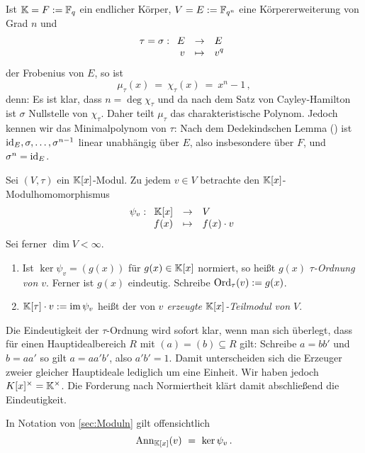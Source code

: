\begin{bemerkung}
  \label{bem:mipo_frob}
  Ist $\mathbb{K}  = F :=\mathbb{F}_q$ ein endlicher Körper, 
  $V = E := \mathbb{F}_{q^n}$ eine Körpererweiterung
  von Grad $n$ und 
  \[\tau = \sigma: \funcdef{E & \to & E\\
    v &\mapsto & v^q}\]
  der Frobenius von $E$, so ist
  \[ \mu_\tau(x) \ =\ \chi_\tau(x) \ =\ x^n - 1\,,\]
  denn: Es ist klar, dass $n = \deg \chi_\tau$ und da nach dem Satz von
  Cayley-Hamilton ist $\sigma$ Nullstelle von $\chi_\tau$. Daher teilt
  $\mu_\tau$ das charakteristische Polynom. Jedoch kennen wir das
  Minimalpolynom von $\tau$: Nach dem Dedekindschen Lemma
  () ist 
  $\operatorname{id}_E,\sigma,\ldots,\sigma^{n-1}$ linear unabhängig über $E$, 
  also insbesondere über $F$, und $\sigma^n = \operatorname{id}_E$.
\end{bemerkung}


\begin{definition}
  Sei $(V,\tau)$ ein $\mathbb{K}[x]$-Modul. Zu jedem $v \in V$ betrachte den
  $\mathbb{K}[x]$-Modulhomomorphismus
  \[ \psi_v: \funcdef{\K[x] & \to & V \\
    f(x) & \mapsto & f(x)\cdot v }  \]
  Sei ferner $\dim V < \infty$.
  \begin{enumerate}
    \item Ist $\ker\psi_v = (g(x))$ für $g(x)\in \mathbb{K}[x]$ normiert, so heißt
      $g(x)$ \emph{$\tau$-Ordnung von $v$}\@. Ferner ist $g(x)$ eindeutig.
      Schreibe $\operatorname{Ord}_\tau(v) := g(x)$.
    \item $\mathbb{K}[\tau]\cdot v := \operatorname{im}{\psi_v}$ heißt der von \emph{$v$ erzeugte
      $\mathbb{K}[x]$-Teilmodul von $V$}.
  \end{enumerate}
\end{definition}

\begin{bemerkung}
  Die Eindeutigkeit der $\tau$-Ordnung wird sofort klar, wenn man sich
  überlegt, dass für einen Hauptidealbereich $R$ mit $(a) = (b) \subseteq R$ 
  gilt: Schreibe $a = b b'$ und $b = a a'$ so gilt $a = a a'b'$, also 
  $a'b' = 1$. Damit unterscheiden sich die Erzeuger zweier gleicher Hauptideale
  lediglich um eine Einheit. Wir haben jedoch $K[x]^\times = \mathbb{K}^\times$. Die
  Forderung nach Normiertheit klärt damit abschließend die Eindeutigkeit.
\end{bemerkung}


\begin{bemerkung}
  In Notation von \autoref{sec:Moduln} gilt offensichtlich
  \[ \operatorname{Ann}_{\mathbb{K}[x]}(v) \ =\  \ker\psi_v \,.\]
\end{bemerkung}

